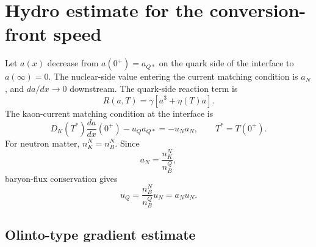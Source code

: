 \section{Hydro estimate for the conversion-front speed}
\label{sec:hydro-front-speed}

Let \(a(x)\) decrease from \(a(0^+)=a_{Q*}\) on the quark side of the interface
to \(a(\infty)=0\). The nuclear-side value entering the current matching
condition is \(a_N\), and \(da/dx\to0\) downstream. The quark-side reaction
term is
\begin{equation}
R(a,T)=\gamma\left[a^3+\eta(T)a\right].
\end{equation}
The kaon-current matching condition at the interface is
\begin{equation}
D_K(T^*)\frac{da}{dx}(0^+)-u_Qa_{Q*}=-u_Na_N,
\qquad
T^*=T(0^+).
\end{equation}
For neutron matter, \(n_K^N=n_B^N\). Since
\begin{equation}
a_N=\frac{n_K^N}{n_B^Q},
\end{equation}
baryon-flux conservation gives
\begin{equation}
u_Q=\frac{n_B^N}{n_B^Q}u_N=a_Nu_N .
\end{equation}

\subsection{Olinto-type gradient estimate}
\label{sec:olinto-hydro-estimate}

